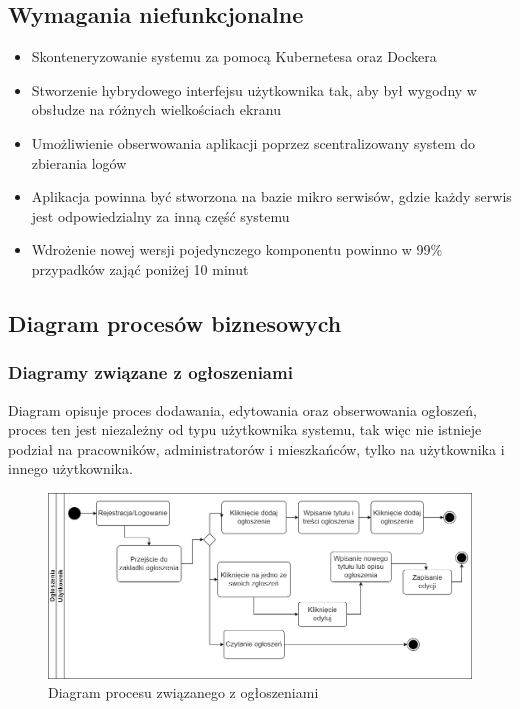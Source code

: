 \subsection{Wymagania niefunkcjonalne}
\begin{itemize}
    \item Skonteneryzowanie systemu za pomocą Kubernetesa oraz Dockera
    \item Stworzenie hybrydowego interfejsu użytkownika tak,  aby był wygodny w obsłudze na różnych wielkościach ekranu
    \item Umożliwienie obserwowania aplikacji poprzez scentralizowany system do zbierania logów
    \item Aplikacja powinna być stworzona na bazie mikro serwisów, gdzie każdy serwis jest odpowiedzialny za inną część systemu
    \item Wdrożenie nowej wersji pojedynczego komponentu powinno w 99\% przypadków zająć poniżej 10 minut
\end{itemize}
\subsection{Diagram procesów biznesowych}
\subsubsection{Diagramy związane z ogłoszeniami}
Diagram opisuje proces dodawania, edytowania oraz obserwowania ogłoszeń, proces ten jest niezależny od typu użytkownika systemu, tak więc nie istnieje podział na pracowników, administratorów i mieszkańców, tylko na użytkownika i innego użytkownika.
\begin{figure}[H]
    \centering
    \includegraphics[width=1\linewidth]{img/ogloszenia_diag.png}
    \caption{Diagram procesu związanego z ogłoszeniami}
    \label{fig:posts-diag}
\end{figure}
